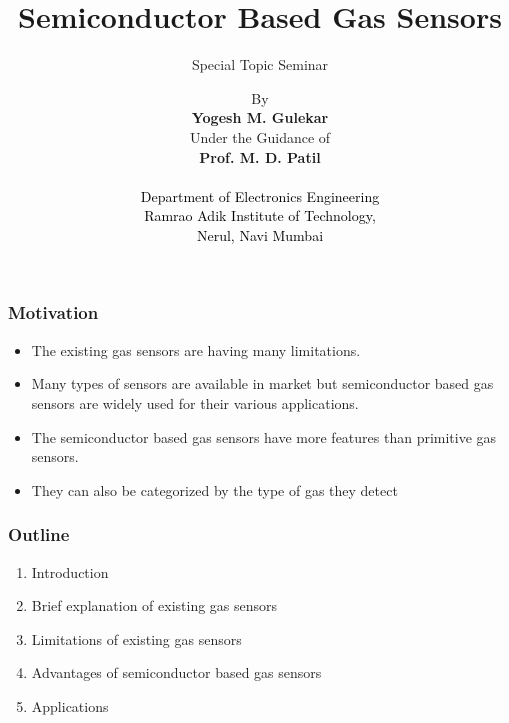 \documentclass{beamer}
\title{Semiconductor Based Gas Sensors }
\subtitle{Special Topic Seminar}
\begin{document}
\author[SysCon] {By \\ \vspace{0.05in} \textbf{Yogesh M. Gulekar } \\ \vspace{0.01in} {Under the Guidance of} \\ \textbf{Prof. M. D. Patil}\\
\textcolor{black}{ \\ Department of Electronics Engineering} \\ \textcolor{black}{Ramrao Adik Institute of Technology,\\ Nerul, Navi Mumbai } \\
}

\begin{frame}
\begin{center}
\end{center}
\titlepage
\end{frame}

\begin{frame}
\frametitle{Motivation}
\begin{itemize}
\item {The existing gas sensors are having many limitations.}
\item {Many types of sensors are available in market but semiconductor based gas sensors are widely used for their various applications.}
\item {The semiconductor based gas sensors have more features than primitive gas sensors.}
\item {They can also be categorized by the type of gas they detect}
\end{itemize}
\end{frame}


\begin{frame}
\frametitle{Outline}
\begin{enumerate}
\item {Introduction}
\item {Brief explanation of existing gas sensors}
\item {Limitations of existing gas sensors }
\item {Advantages of semiconductor based gas sensors}
\item {Applications}
\end{enumerate}
\end{frame}
\end{document}
